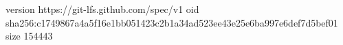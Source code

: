 version https://git-lfs.github.com/spec/v1
oid sha256:c1749867a4a5f16e1bb051423c2b1a34ad523ee43e25e6ba997e6def7d5bef01
size 154443
